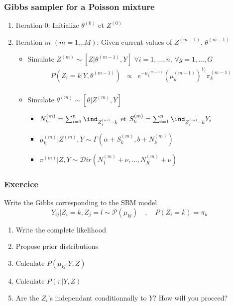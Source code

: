  
\begin{frame}\frametitle{Gibbs sampler for a Poisson mixture}
\begin{block}{}
\begin{enumerate}
\item[] \vert Iteration 0:  \noir Initialize $\theta^{(0)}$  et $Z^{(0)}$
\item[] \vert Iteration $m$ $(m=1\dots M)$: \noir  Given current values of $Z^{(m-1)}$, $\theta^{(m-1)}$
 \begin{itemize}
 \item Simulate $ Z^{(m)} \sim [ Z| \theta^{(m-1)},  Y]$
 $\forall i=1,\dots,n$, $\forall g=1,\dots, G$
 \begin{eqnarray*}
   P(Z_i = k | Y,\theta^{(m-1)})&\propto&  e^{- \mu^{(m-1)}_{k}} (\mu^{(m-1)}_{k})^{Y_i}  \pi^{(m-1)}_{k}\\
  \end{eqnarray*}
 \item Simulate  $\theta^{(m)} \sim [\theta |  Z^{(m)},  Y]$
 {\scriptsize 
  \begin{itemize}
  \item  $N^{(m)}_k = \sum_{i=1}^n \ind_{Z^{(m)}_i=k}$ et  $S^{(m)}_{k} = \sum_{i=1}^n \ind_{Z^{(m)}_i=k}Y_{i}$
  \item  $ \mu^{(m)}_{k} | Z^{(m)},Y  \sim \Gamma\left(\alpha + S^{(m)}_{k}, b + N^{(m)}_k\right)$
  \item $ \pi^{(m)} | Z, Y  \sim \mathcal{D}ir(N^{(m)}_1 + \nu ,\dots,N^{(m)}_K + \nu) $
 \end{itemize}}
\end{itemize}
 \end{enumerate}
 \end{block}
  \end{frame}
  
  \begin{frame}\frametitle{Exercice}
Write the Gibbs corresponding to the SBM model
 $$Y_{ij} | Z_i = k, Z_j = l \sim \mathcal{P}(\mu_{kl})\quad , \quad P(Z_i = k) = \pi_k$$
\begin{enumerate}
 \item Write  the complete likelihood
 \item Propose prior distributions
 \item Calculate $P(\mu_{kl} | Y,Z)$
 \item Calculate $P(\pi | Y,Z)$
\item Are the $Z_i$'s independant conditionnally to $Y$? How will you proceed?  
 \end{enumerate}

  \end{frame}


